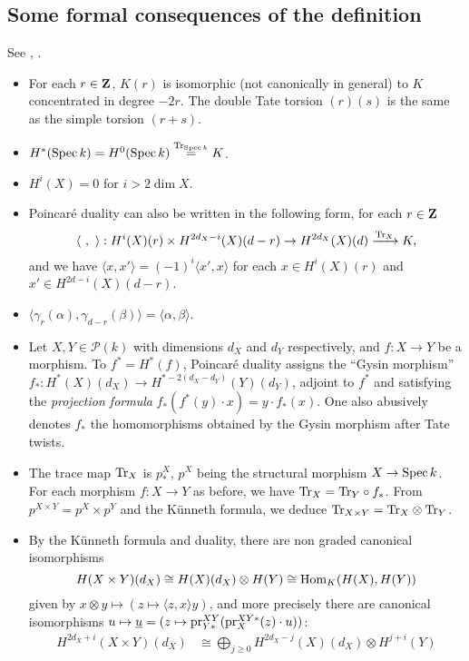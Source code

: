 \documentclass[../main.tex]{subfiles}
\begin{document}
\subsection{Some formal consequences of the definition}
See \cite{Kl68}, \cite{Kl94}.
\begin{itemize}
    \item For each $r \in \mathbf{Z}$, $K(r)$ is isomorphic (not canonically in general) to $K$ concentrated in degree $-2r$. The double Tate torsion $(r)(s)$ is the same as the simple torsion $(r + s)$.
    \item $H^*(\operatorname{Spec} k) = H^0(\operatorname{Spec} k) \stackrel{\mathrm{Tr}_{\operatorname{Spec} k}}{=} K$.
    \item $H^i(X) = 0$ for $i > 2 \dim X$.
    \item Poincaré duality can also be written in the following form, for each $r \in \mathbf{Z}$
    $$\langle\ ,\ \rangle : H^i(X)(r) \times H^{2d_X - i}(X)(d - r) \to H^{2d_X}(X)(d) \xrightarrow{\mathrm{Tr}_X} K,$$
    and we have $\langle x, x'\rangle = (-1)^i \langle x', x\rangle$ for each $x \in H^i(X)(r)$ and $x' \in H^{2d-i}(X)(d-r)$.
    \item $\langle \gamma_r(\alpha), \gamma_{d - r}(\beta)\rangle = \langle \alpha, \beta\rangle$.
    \item Let $X, Y \in \mathcal{P}(k)$ with dimensions $d_X$ and $d_Y$ respectively, and $f : X \to Y$ be a morphism.
    To $f^* = H^*(f)$, Poincaré duality assigns the \enquote{Gysin morphism} $f_* : H^*(X)(d_X) \to H^{* - 2(d_X - d_Y)}(Y)(d_Y)$, adjoint to $f^*$ and satisfying the \emph{projection formula} $f_*(f^*(y) \cdot x) = y \cdot f_*(x)$.
    One also abusively denotes $f_*$ the homomorphisms obtained by the Gysin morphism after Tate twists.
    \item The trace map $\mathrm{Tr}_X$ is $p^X_*$, $p^X$ being the structural morphism $X \to \operatorname{Spec} k$.
    For each morphism $f : X \to Y$ as before, we have $\mathrm{Tr}_X = \mathrm{Tr}_Y \circ f_*$. From $p^{X \times Y} = p^X \times p^Y$ and the Künneth formula, we deduce $\mathrm{Tr}_{X \times Y} = \mathrm{Tr}_X \otimes \mathrm{Tr}_Y$.
    \item By the Künneth formula and duality, there are non graded canonical isomorphisms
    $$H(X \times Y)(d_X) \cong H(X)(d_X) \otimes H(Y) \cong \operatorname{Hom}_K(H(X), H(Y))$$
    given by $x \otimes y \mapsto (z \mapsto \langle z, x\rangle y)$, and more precisely there are canonical isomorphisms $u \mapsto \underline{u} = (z \mapsto \mathrm{pr}^{XY}_{Y*}(\mathrm{pr}^{XY*}_{X}(z) \cdot u))$:
    \begin{align*}
        H^{2d_X + i}(X \times Y)(d_X) &\cong \bigoplus_{j \geq 0} H^{2d_X - j}(X)(d_X) \otimes H^{j+i}(Y)\\

\end{align*}
\end{itemize}
\end{document}
